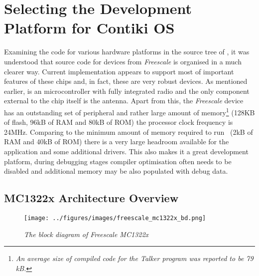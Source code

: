 \section{Selecting the Development \\Platform for Contiki OS} \label{sec:MCX}

  Examining the code for various hardware platforms in the source
 tree of \Contiki, it was understood that source code for
  devices from \emph{Freescale} is organised in a
 much clearer way. Current implementation appears to support most
 of important features of these chips and, in fact, these are
 very robust devices. As mentioned earlier,  is an
  microcontroller with fully integrated radio and
 the only component external to the chip itself is the antenna.
 Apart from this, the \emph{Freescale} device has an outstanding
 set of peripheral and rather large amount of memory\footnote{\emph{%
 An average size of compiled code for the Talker program was
 reported to be 79 kB.}} (128KB of flash, 96kB of RAM and 80kB
 of ROM) the processor clock frequency is 24MHz. Comparing to
 the minimum amount of memory required to run \Contiki\ (2kB of RAM
 and 40kB of ROM) there is a very large headroom available for the
 application and some additional drivers. This also makes it a great
 development platform, during debugging stages compiler optimisation
 often needs to be disabled and additional memory may be also
 populated with debug data.

\subsection{MC1322x Architecture Overview}


\begin{figure}
\centering
\texttt{[image: ../figures/images/freescale\_mc1322x\_bd.png]}
\caption{\emph{The block diagram of Freescale MC1322x \cite{links:freescale:mc1322x}}} \label{fig:mc1322x}
\end{figure}

